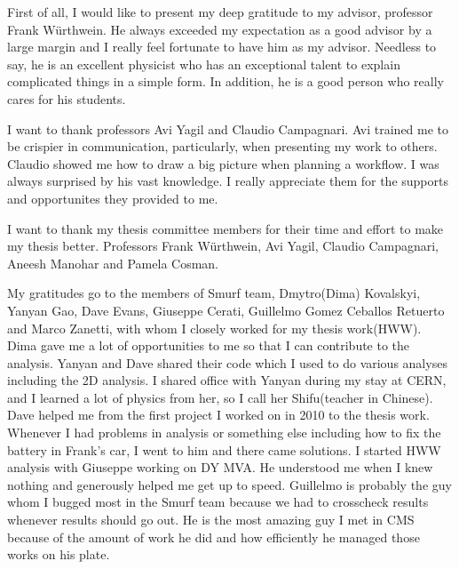 \begin{frontmatter}
%
\tableofcontents
\listoffigures  %
\listoftables   %



%
%
\begin{acknowledgements} 
 First of all, I would like to present my deep gratitude to my advisor, professor Frank W\"urthwein. 
 He always exceeded my expectation as a good advisor by a large margin and I really feel fortunate to 
 have him as my advisor. Needless to say, he is an excellent physicist who has an exceptional 
 talent to explain complicated things in a simple form. In addition, he is a good person who really 
 cares for his students.  

 I want to thank professors Avi Yagil and Claudio Campagnari. Avi trained me to be 
 crispier in communication, particularly, when presenting my work to others.
 Claudio showed me how to draw a big picture when planning a workflow. I was always surprised 
 by his vast knowledge. 
 I really appreciate them for the supports and opportunites they provided to me. 

 I want to thank my thesis committee members for their time and effort to make my thesis better. 
 Professors Frank W\"urthwein, Avi Yagil, Claudio Campagnari, Aneesh Manohar and Pamela Cosman.  
 
 My gratitudes go to the members of Smurf team,  Dmytro(Dima) Kovalskyi, Yanyan Gao, Dave Evans, 
 Giuseppe Cerati, Guillelmo Gomez Ceballos Retuerto and Marco Zanetti, 
 with whom I closely worked for my thesis work(HWW). 
 Dima gave me a lot of opportunities to me so that I can contribute to the analysis. 
 Yanyan and Dave shared their code which I used to do various analyses including the 2D analysis. 
 I shared office with Yanyan during my stay at CERN, and I learned a lot of physics from her, 
 so I call her Shifu(teacher in Chinese). Dave helped me from the first project I worked on in 2010 
 to the thesis work. Whenever I had problems in analysis or something else including how to 
 fix the battery in Frank's car, I went to him and there came solutions.
 I started HWW analysis with Giuseppe working on DY MVA. He understood me when I knew nothing 
 and generously helped me get up to speed. Guillelmo is probably the guy whom I bugged most 
 in the Smurf team because we had to crosscheck results whenever results should go out. 
 He is the most amazing guy I met in CMS because of the amount of work he did and how 
 efficiently he managed those works on his plate. 
 

\end{acknowledgements}
\end{frontmatter}
